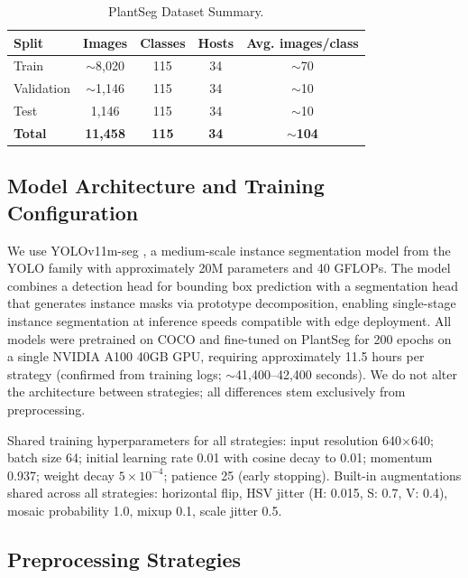 \documentclass[preprint,12pt]{elsarticle}
\begin{document}
\begin{table}[h]
\centering
\caption{PlantSeg Dataset Summary.}
\label{tab:plantseg_description}
\begin{tabular}{lcccc}
\toprule
\textbf{Split} & \textbf{Images} & \textbf{Classes} & \textbf{Hosts} & \textbf{Avg. images/class} \\
\midrule
Train & $\sim$8,020 & 115 & 34 & $\sim$70 \\
Validation & $\sim$1,146 & 115 & 34 & $\sim$10 \\
Test & 1,146 & 115 & 34 & $\sim$10 \\
\midrule
\textbf{Total} & \textbf{11,458} & \textbf{115} & \textbf{34} & \textbf{$\sim$104} \\
\bottomrule
\end{tabular}
\end{table}

\subsection{Model Architecture and Training Configuration}

We use YOLOv11m-seg \citep{yolov11_2024}, a medium-scale instance segmentation model from the YOLO family with approximately 20M parameters and 40 GFLOPs. The model combines a detection head for bounding box prediction with a segmentation head that generates instance masks via prototype decomposition, enabling single-stage instance segmentation at inference speeds compatible with edge deployment. All models were pretrained on COCO \citep{lin2014microsoft} and fine-tuned on PlantSeg for 200 epochs on a single NVIDIA A100 40GB GPU, requiring approximately 11.5 hours per strategy (confirmed from training logs; $\sim$41,400--42,400 seconds). We do not alter the architecture between strategies; all differences stem exclusively from preprocessing.

Shared training hyperparameters for all strategies: input resolution 640$\times$640; batch size 64; initial learning rate 0.01 with cosine decay to 0.01; momentum 0.937; weight decay $5\times10^{-4}$; patience 25 (early stopping). Built-in augmentations shared across all strategies: horizontal flip, HSV jitter (H: 0.015, S: 0.7, V: 0.4), mosaic probability 1.0, mixup 0.1, scale jitter 0.5.

\subsection{Preprocessing Strategies}
\label{sec:strategies}
\end{document}
